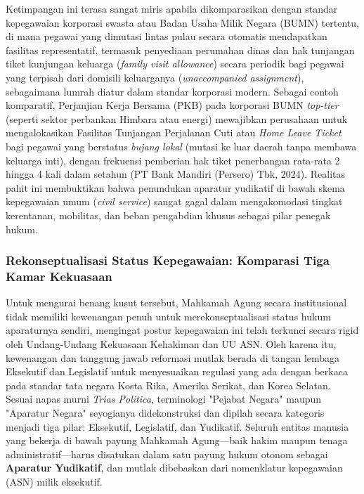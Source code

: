 \documentclass[12pt, a4paper]{article}
\begin{document}
Ketimpangan ini terasa sangat miris apabila dikomparasikan dengan standar kepegawaian korporasi swasta atau Badan Usaha Milik Negara (BUMN) tertentu, di mana pegawai yang dimutasi lintas pulau secara otomatis mendapatkan fasilitas representatif, termasuk penyediaan perumahan dinas dan hak tunjangan tiket kunjungan keluarga (\textit{family visit allowance}) secara periodik bagi pegawai yang terpisah dari domisili keluarganya (\textit{unaccompanied assignment}), sebagaimana lumrah diatur dalam standar korporasi modern. Sebagai contoh komparatif, Perjanjian Kerja Bersama (PKB) pada korporasi BUMN \textit{top-tier} (seperti sektor perbankan Himbara atau energi) mewajibkan perusahaan untuk mengalokasikan Fasilitas Tunjangan Perjalanan Cuti atau \textit{Home Leave Ticket} bagi pegawai yang berstatus \textit{bujang lokal} (mutasi ke luar daerah tanpa membawa keluarga inti), dengan frekuensi pemberian hak tiket penerbangan rata-rata 2 hingga 4 kali dalam setahun (PT Bank Mandiri (Persero) Tbk, 2024). Realitas pahit ini membuktikan bahwa penundukan aparatur yudikatif di bawah skema kepegawaian umum (\textit{civil service}) sangat gagal dalam mengakomodasi tingkat kerentanan, mobilitas, dan beban pengabdian khusus sebagai pilar penegak hukum.

\subsubsection{Rekonseptualisasi Status Kepegawaian: Komparasi Tiga Kamar Kekuasaan}

Untuk mengurai benang kusut tersebut, Mahkamah Agung secara institusional tidak memiliki kewenangan penuh untuk merekonseptualisasi status hukum aparaturnya sendiri, mengingat postur kepegawaian ini telah terkunci secara rigid oleh Undang-Undang Kekuasaan Kehakiman dan UU ASN. Oleh karena itu, kewenangan dan tanggung jawab reformasi mutlak berada di tangan lembaga Eksekutif dan Legislatif untuk menyesuaikan regulasi yang ada dengan berkaca pada standar tata negara Kosta Rika, Amerika Serikat, dan Korea Selatan. Sesuai napas murni \textit{Trias Politica}, terminologi "Pejabat Negara" maupun "Aparatur Negara" seyogianya didekonstruksi dan dipilah secara kategoris menjadi tiga pilar: Eksekutif, Legislatif, dan Yudikatif. Seluruh entitas manusia yang bekerja di bawah payung Mahkamah Agung—baik hakim maupun tenaga administratif—harus disatukan dalam satu payung hukum otonom sebagai \textbf{Aparatur Yudikatif}, dan mutlak dibebaskan dari nomenklatur kepegawaian (ASN) milik eksekutif.
\end{document}
